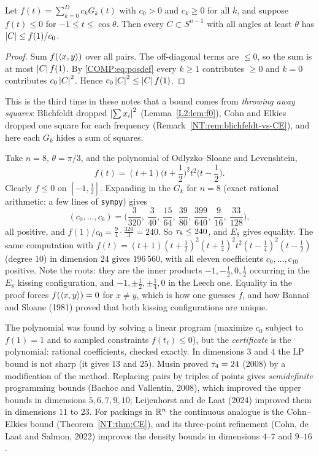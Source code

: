 \begin{theorem}\label{COMP:thm:LP}
Let $f(t)=\sum_{k=0}^Dc_kG_k(t)$ with $c_0>0$ and $c_k\ge0$ for all $k$, and suppose $f(t)\le0$ for
$-1\le t\le\cos\theta$. Then every $C\subset S^{n-1}$ with all angles at least $\theta$ has
$\left\lvert C \right\rvert\le f(1)/c_0$.
\end{theorem}

\begin{proof}
Sum $f(\langle x, y\rangle)$ over all pairs. The off-diagonal terms are $\le0$, so the sum is at most $\left\lvert C \right\rvert f(1)$. By
\eqref{COMP:eq:posdef} every $k\ge1$ contributes $\ge0$ and $k=0$ contributes $c_0\left\lvert C \right\rvert^2$. Hence
$c_0\left\lvert C \right\rvert^2\le\left\lvert C \right\rvert f(1)$.
\end{proof}

This is the third time in these notes that a bound comes from \emph{throwing away squares}: Blichfeldt
dropped $\left\lvert \sum x_i \right\rvert^2$ (Lemma~\ref{L2:lem:f0}), Cohn and Elkies dropped one square for each
frequency (Remark~\ref{NT:rem:blichfeldt-vs-CE}), and here each $G_k$ hides a sum of squares.

\begin{example}\label{COMP:ex:240}
Take $n=8$, $\theta=\pi/3$, and the polynomial of Odlyzko--Sloane and Levenshtein,
\[
  f(t)=(t+1)\Big(t+\frac12\Big)^2t^2\Big(t-\frac12\Big).
\]
Clearly $f\le0$ on $[-1,\frac12]$. Expanding in the $G_k$ for $n=8$ (exact rational arithmetic; a few lines of
\texttt{sympy}) gives
\[
  (c_0,\dots,c_6)=\Big(\frac3{320},\ \frac3{40},\ \frac{15}{64},\ \frac{39}{80},\ \frac{399}{640},\ \frac9{16},\
  \frac{33}{128}\Big),
\]
all positive, and $f(1)/c_0=\frac94\cdot\frac{320}3=240$. So $\tau_8\le240$, and $E_8$ gives equality.
The same computation with
$f(t)=(t+1)(t+\frac12)^2(t+\frac14)^2t^2(t-\frac14)^2(t-\frac12)$ (degree $10$) in dimension $24$ gives
$196\,560$, with all eleven coefficients $c_0,\dots,c_{10}$ positive. Note the roots: they are the inner products $-1,-\frac12,0,\frac12$
occurring in the $E_8$ kissing configuration, and $-1,\pm\frac12,\pm\frac14,0$ in the Leech one. Equality in
the proof forces $f(\langle x, y\rangle)=0$ for $x\ne y$, which is how one guesses $f$, and how Bannai and Sloane
(1981) proved that both kissing configurations are unique.
\end{example}

The polynomial was found by solving a linear program (maximize $c_0$ subject to $f(1)=1$ and to
sampled constraints $f(t_\ell)\le0$), but the \emph{certificate} is the polynomial: rational coefficients,
checked exactly. In dimensions $3$ and $4$ the LP bound is not sharp (it gives $13$ and $25$). Musin
proved $\tau_4=24$ (2008) by a modification of the method. Replacing pairs by triples of points gives
\emph{semidefinite} programming bounds (Bachoc and Vallentin, 2008), which improved the upper bounds in
dimensions $5,6,7,9,10$; Leijenhorst and de Laat (2024) improved them in dimensions $11$ to $23$. For
packings in $\mathbb{R}^n$ the continuous analogue is the Cohn--Elkies bound (Theorem~\ref{NT:thm:CE}), and its
three-point refinement (Cohn, de Laat and Salmon, 2022) improves the density bounds in dimensions $4$--$7$
and $9$--$16$.


